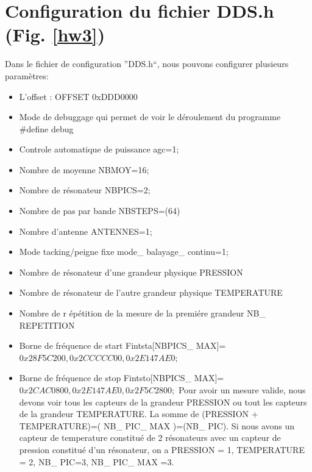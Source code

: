 \documentclass[a4paper]{article}
\begin{document}
\section{Configuration du fichier DDS.h (Fig. \ref{hw3})}

Dans le fichier de configuration ''DDS.h``, nous pouvons configurer plusieurs param\`etres:
\begin{itemize}
\item L'offset : OFFSET 0xDDD0000 
\item Mode de debuggage qui permet de voir le d\'eroulement du programme #define debug
\item Controle automatique de puissance  agc=1;
\item Nombre de moyenne NBMOY=16;
\item Nombre de r\'esonateur NBPICS=2; 
\item Nombre de pas par bande NBSTEPS=(64) 
\item Nombre d'antenne ANTENNES=1;
\item Mode tacking/peigne fixe mode\_ balayage\_ continu=1;	  
\item Nombre de r\'esonateur d'une grandeur physique  PRESSION
\item Nombre de r\'esonateur de l'autre grandeur physique TEMPERATURE
\item Nombre de r \'ep\'etition de la mesure de la premi\'ere grandeur NB\_ REPETITION
\item Borne de fr\'equence de start Fintsta[NBPICS\_ MAX]=${0x28F5C200,0x2CCCCC00,0x2E147AE0};$
\item Borne de fr\'equence de stop Fintsto[NBPICS\_ MAX]=${0x2CAC0800,0x2E147AE0,0x2F5C2800};$
Pour avoir un mesure valide, nous devons voir tous les capteurs de la grandeur PRESSION ou tout les capteurs de la grandeur TEMPERATURE.
La somme de (PRESSION + TEMPERATURE)=( NB\_ PIC\_ MAX )=(NB\_ PIC). Si nous avons un capteur de temperature constitu\'e de 2 r\'esonateurs avec 
un capteur de pression constitu\'e d'un r\'esonateur, on a PRESSION = 1, TEMPERATURE = 2, NB\_ PIC=3, NB\_ PIC\_ MAX =3.
\end{itemize}
\end{document}
